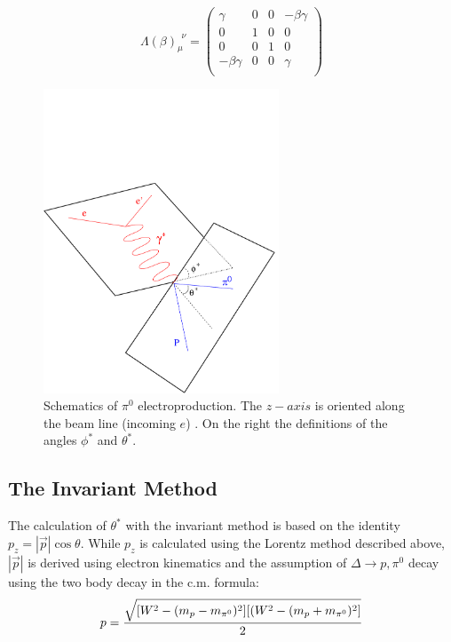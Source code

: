 $$
 \Lambda(\beta)_\mu^{\,\;\nu} =  \left( 
\begin{array}{cccc}
\gamma & 0 & 0 &  -\beta\gamma \\
 0 & 1 & 0 & 0\\
 0 & 0 & 1 & 0\\
-\beta\gamma & 0 & 0  & \gamma\\
\end{array}
\right)
$$


\begin{figure}[h]
 \begin{center}
  \includegraphics[width = 7cm, bb = 0 -50 570 580]{systematics/img/kine}
  \caption[Schematics of  $\pi^0$ electroproduction]
          { Schematics of  $\pi^0$ electroproduction. The $z-axis$
           is oriented along the beam line (incoming $e$) . On the right the definitions
           of the angles $\phi^*$ and $\theta^*$.}
  \label{fig:kinema}
 \end{center}
\end{figure} 




\subsection{The Invariant Method}
The calculation of $\theta^*$ with the invariant method is based on the identity $p_z = |\vec{p}|\cos\theta$.
While $p_z$ is calculated using the Lorentz method described above, $|\vec{p}|$ is derived using electron
kinematics and the assumption of $\Delta \rightarrow p,\pi^0$ decay using the two body decay in the c.m.
formula:
$$
 p = \frac{\displaystyle \sqrt{ [W^2-(m_p-m_{\pi^0})^2][(W^2-(m_p+m_{\pi^0})^2 ] }}{\displaystyle 2}
$$


